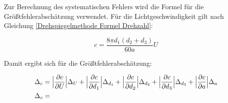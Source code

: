 Zur Berechnung des systematischen Fehlers wird die Formel für die Größtfehlerabschätzung verwendet. Für die Lichtgeschwindigkeit gilt nach Gleichung \ref{Drehspiegelmethode Formel Drehzahl}:

\begin{equation}
    c = \frac{8 \pi  d_1 (d_2 + d_3)}{60a} U
\end{equation}

Damit ergibt sich für die Größtfehlerabschätzung:

\begin{align}
    \Delta_c &= \Bigl| \frac{\partial c}{\partial U} \Bigl| \Delta_U + \Bigl|
    \frac{\partial c}{\partial d_1} \Bigl| \Delta_{d_1} + \Bigl| \frac{\partial
    c}{\partial d_2} \Bigl| \Delta_{d_2} + \Bigl| \frac{\partial c}{\partial d_3}
    \Bigl| \Delta_{d_3} + \Bigl| \frac{\partial c}{\partial a} \Bigl| \Delta_a \\
    \Delta_c &=
\end{align}